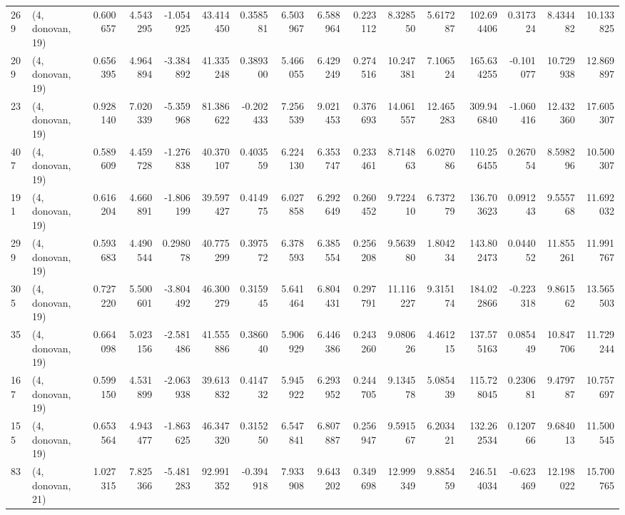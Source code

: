 \begin{tabular}{llrrrrrrrrrrrrrr}
269 &  (4, donovan, 19) &   0.600657 &   4.543295 &  -1.054925 &    43.414450 &   0.358581 &   6.503967 &   6.588964 &  0.223112 &   8.328550 &   5.617287 &   102.694406 &  0.317324 &   8.434482 &  10.133825 \\
209 &  (4, donovan, 19) &   0.656395 &   4.964894 &  -3.384892 &    41.335248 &   0.389300 &   5.466055 &   6.429249 &  0.274516 &  10.247381 &   7.106524 &   165.634255 & -0.101077 &  10.729938 &  12.869897 \\
23  &  (4, donovan, 19) &   0.928140 &   7.020339 &  -5.359968 &    81.386622 &  -0.202433 &   7.256539 &   9.021453 &  0.376693 &  14.061557 &  12.465283 &   309.946840 & -1.060416 &  12.432360 &  17.605307 \\
407 &  (4, donovan, 19) &   0.589609 &   4.459728 &  -1.276838 &    40.370107 &   0.403559 &   6.224130 &   6.353747 &  0.233461 &   8.714863 &   6.027086 &   110.256455 &  0.267054 &   8.598296 &  10.500307 \\
191 &  (4, donovan, 19) &   0.616204 &   4.660891 &  -1.806199 &    39.597427 &   0.414975 &   6.027858 &   6.292649 &  0.260452 &   9.722410 &   6.737279 &   136.703623 &  0.091243 &   9.555768 &  11.692032 \\
299 &  (4, donovan, 19) &   0.593683 &   4.490544 &   0.298078 &    40.775299 &   0.397572 &   6.378593 &   6.385554 &  0.256208 &   9.563980 &   1.804234 &   143.802473 &  0.044052 &  11.855261 &  11.991767 \\
305 &  (4, donovan, 19) &   0.727220 &   5.500601 &  -3.804492 &    46.300279 &   0.315945 &   5.641464 &   6.804431 &  0.297791 &  11.116227 &   9.315174 &   184.022866 & -0.223318 &   9.861562 &  13.565503 \\
35  &  (4, donovan, 19) &   0.664098 &   5.023156 &  -2.581486 &    41.555886 &   0.386040 &   5.906929 &   6.446386 &  0.243260 &   9.080626 &   4.461215 &   137.575163 &  0.085449 &  10.847706 &  11.729244 \\
167 &  (4, donovan, 19) &   0.599150 &   4.531899 &  -2.063938 &    39.613832 &   0.414732 &   5.945922 &   6.293952 &  0.244705 &   9.134578 &   5.085439 &   115.728045 &  0.230681 &   9.479787 &  10.757697 \\
155 &  (4, donovan, 19) &   0.653564 &   4.943477 &  -1.863625 &    46.347320 &   0.315250 &   6.547841 &   6.807887 &  0.256947 &   9.591567 &   6.203421 &   132.262534 &  0.120766 &   9.684013 &  11.500545 \\
83  &  (4, donovan, 21) &   1.027315 &   7.825366 &  -5.481283 &    92.991352 &  -0.394918 &   7.933908 &   9.643202 &  0.349698 &  12.999349 &   9.885459 &   246.514034 & -0.623469 &  12.198022 &  15.700765 \\

\end{tabular}
